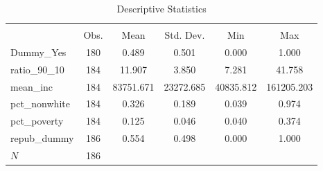 \begin{table}[htbp]
\centering
\caption{Descriptive Statistics}
\label{tab:descriptives}
\begin{tabular}{lccccc}
\toprule
            &\multicolumn{5}{c}{}                                            \\
            &        Obs.&        Mean&   Std. Dev.&         Min&         Max\\
\midrule
Dummy\_Yes   &         180&       0.489&       0.501&       0.000&       1.000\\
ratio\_90\_10 &         184&      11.907&       3.850&       7.281&      41.758\\
mean\_inc    &         184&   83751.671&   23272.685&   40835.812&  161205.203\\
pct\_nonwhite&         184&       0.326&       0.189&       0.039&       0.974\\
pct\_poverty &         184&       0.125&       0.046&       0.040&       0.374\\
repub\_dummy &         186&       0.554&       0.498&       0.000&       1.000\\
\midrule
\(N\)       &         186&            &            &            &            \\
\bottomrule
\end{tabular}
\end{table}
